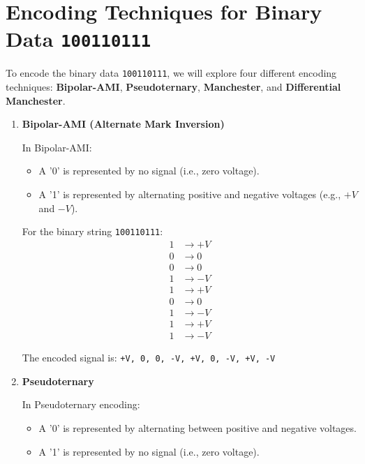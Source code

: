\documentclass{article}
\begin{document}
\section*{Encoding Techniques for Binary Data \texttt{100110111}}

To encode the binary data \texttt{100110111}, we will explore four different encoding techniques: \textbf{Bipolar-AMI}, \textbf{Pseudoternary}, \textbf{Manchester}, and \textbf{Differential Manchester}.

\begin{enumerate}[label=\alph*.]
    \item \textbf{Bipolar-AMI (Alternate Mark Inversion)}
    
    In Bipolar-AMI:
    \begin{itemize}
        \item A '0' is represented by no signal (i.e., zero voltage).
        \item A '1' is represented by alternating positive and negative voltages (e.g., $+V$ and $-V$).
    \end{itemize}

    For the binary string \texttt{100110111}:
    \begin{align*}
        \text{1} &\rightarrow +V \\
        \text{0} &\rightarrow 0 \\
        \text{0} &\rightarrow 0 \\
        \text{1} &\rightarrow -V \\
        \text{1} &\rightarrow +V \\
        \text{0} &\rightarrow 0 \\
        \text{1} &\rightarrow -V \\
        \text{1} &\rightarrow +V \\
        \text{1} &\rightarrow -V
    \end{align*}

    The encoded signal is: \texttt{+V, 0, 0, -V, +V, 0, -V, +V, -V}

    \item \textbf{Pseudoternary}
    
    In Pseudoternary encoding:
    \begin{itemize}
        \item A '0' is represented by alternating between positive and negative voltages.
        \item A '1' is represented by no signal (i.e., zero voltage).
    \end{itemize}


\end{enumerate}
\end{document}
